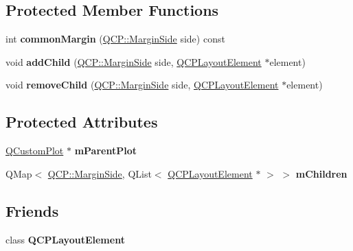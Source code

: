 \subsection*{Protected Member Functions}
\begin{DoxyCompactItemize}
\item 
\mbox{\label{class_q_c_p_margin_group_aea6a00373b3a0305de56c34d2423ea99}} 
int {\bfseries common\+Margin} (\hyperlink{namespace_q_c_p_a7e487e3e2ccb62ab7771065bab7cae54}{Q\+C\+P\+::\+Margin\+Side} side) const
\item 
\mbox{\label{class_q_c_p_margin_group_acb9c3a35acec655c2895b7eb95ee0524}} 
void {\bfseries add\+Child} (\hyperlink{namespace_q_c_p_a7e487e3e2ccb62ab7771065bab7cae54}{Q\+C\+P\+::\+Margin\+Side} side, \hyperlink{class_q_c_p_layout_element}{Q\+C\+P\+Layout\+Element} $\ast$element)
\item 
\mbox{\label{class_q_c_p_margin_group_a20ab3286062957d99b58db683fe725b0}} 
void {\bfseries remove\+Child} (\hyperlink{namespace_q_c_p_a7e487e3e2ccb62ab7771065bab7cae54}{Q\+C\+P\+::\+Margin\+Side} side, \hyperlink{class_q_c_p_layout_element}{Q\+C\+P\+Layout\+Element} $\ast$element)
\end{DoxyCompactItemize}
\subsection*{Protected Attributes}
\begin{DoxyCompactItemize}
\item 
\mbox{\label{class_q_c_p_margin_group_a23cfa29e3cc0f33a59141b77d8c04edf}} 
\hyperlink{class_q_custom_plot}{Q\+Custom\+Plot} $\ast$ {\bfseries m\+Parent\+Plot}
\item 
\mbox{\label{class_q_c_p_margin_group_a6aa328c8dd6caf95f0fd9818da5796a7}} 
Q\+Map$<$ \hyperlink{namespace_q_c_p_a7e487e3e2ccb62ab7771065bab7cae54}{Q\+C\+P\+::\+Margin\+Side}, Q\+List$<$ \hyperlink{class_q_c_p_layout_element}{Q\+C\+P\+Layout\+Element} $\ast$ $>$ $>$ {\bfseries m\+Children}
\end{DoxyCompactItemize}
\subsection*{Friends}
\begin{DoxyCompactItemize}
\item 
\mbox{\label{class_q_c_p_margin_group_a0790750c7e7f14fdbd960d172655b42b}} 
class {\bfseries Q\+C\+P\+Layout\+Element}
\end{DoxyCompactItemize}


